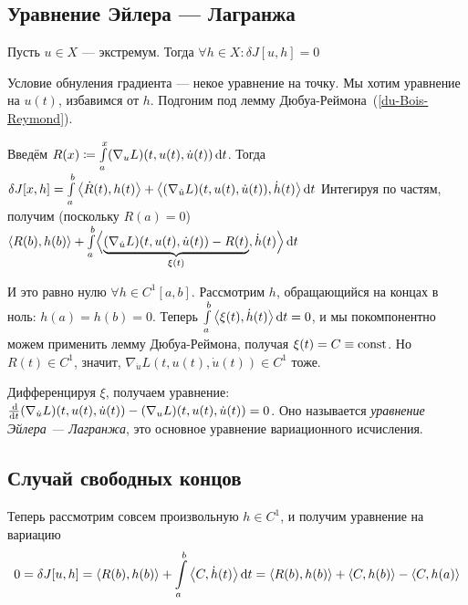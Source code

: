 \documentclass[a4paper]{article}
\begin{document}
    \subsection{Уравнение Эйлера --- Лагранжа}
    Пусть $u \in X$ --- экстремум.
    Тогда $\forall h \in X: \delta J[u, h] = 0$

    Условие обнуления градиента --- некое уравнение на точку.
    Мы хотим уравнение на $u(t)$, избавимся от $h$.
    Подгоним под лемму Дюбуа-Реймона~(\cref{du-Bois-Reymond}).

    Введём $R(x) \coloneqq \int\limits_{a}^{x}(\nabla_u L)(t, u(t), \dot{u}(t))\operatorname{d}\! t$.
    Тогда $\delta J[x, h] = \int\limits_a^b \left\langle\dot{R}(t), h(t)\right\rangle + \left\langle(\nabla_{\dot{u}} L)(t, u(t), \dot{u}(t)), \dot{h}(t)\right\rangle\operatorname{d}\! t$
    Интегируя по частям, получим (поскольку $R(a) = 0$) $\left\langle R(b), h(b)\right\rangle + \int\limits_{a}^{b}\Bigl\langle\underbrace{(\nabla_{\dot{u}}L)(t, u(t), \dot{u}(t)) - R(t)}_{\xi(t)}, \dot{h}(t)\Bigr\rangle\operatorname{d}\! t$

    И это равно нулю $\forall h \in C^1[a, b]$.
    Рассмотрим $h$, обращающийся на концах в ноль: $h(a)=h(b)=0$.
    Теперь $\int\limits_{a}^{b}\left\langle\xi(t), \dot{h}(t)\right\rangle\operatorname{d}\! t = 0$, и мы покомпонентно можем применить лемму Дюбуа-Реймона, получая $\xi(t) = C \equiv \operatorname{const}$.
    Но $R(t) \in C^1$, значит, $\nabla_{\dot{u}}L(t, u(t), \dot{u}(t)) \in C^1$ тоже.

    Дифференцируя $\xi$, получаем уравнение: $\frac{\operatorname{d}\!}{\operatorname{d}\! t}(\nabla_{\dot{u}} L)(t, u(t), \dot{u}(t)) - (\nabla_u L)(t, u(t), \dot{u}(t)) = 0$.
    Оно называется \emph{уравнение Эйлера --- Лагранжа}, это основное уравнение вариационного исчисления.

    \subsection{Случай свободных концов}
    Теперь рассмотрим совсем произвольную $h \in C^1$, и получим уравнение на вариацию \[0 = \delta J[u, h] = \left\langle R(b), h(b)\right\rangle + \int\limits_{a}^{b}\left\langle C, \dot{h}(t)\right\rangle\operatorname{d}\! t = \left\langle R(b), h(b)\right\rangle + \left\langle C, h(b)\right\rangle - \left\langle C, h(a)\right\rangle\]
\end{document}
